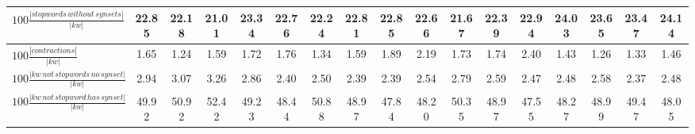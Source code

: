 \documentclass[%
 aip,
 jmp,%
 amsmath,amssymb,
 reprint,%
 floatfix,
]{revtex4-1}
\begin{document}
\begin{table}
\begin{tabular}{|l|| c|c|c|c||  c|c|c|c||   c|c|c|c||   c|c|c|c|}
$100\frac{|stopwords\,without\,synsets|}{|kw|}$ & 22.85 & 22.18 & 21.01 & 23.34 & 22.76 & 22.24 & 22.81 & 22.85 & 22.66 & 21.67 & 22.39 & 22.94 & 24.03 & 23.65 & 23.47 & 24.14 \\\hline
$100\frac{|contractions|}{|kw|}$ & 1.65 & 1.24 & 1.59 & 1.72 & 1.76 & 1.34 & 1.59 & 1.89 & 2.19 & 1.73 & 1.74 & 2.40 & 1.43 & 1.26 & 1.33 & 1.46 \\\hline
$100\frac{|kw\,not\,stopwords\,no\,synset|}{|kw|}$ & 2.94 & 3.07 & 3.26 & 2.86 & 2.40 & 2.50 & 2.39 & 2.39 & 2.54 & 2.79 & 2.59 & 2.47 & 2.48 & 2.58 & 2.37 & 2.48 \\\hline
$100\frac{|kw\,not\,stopword\,has\,synset|}{|kw|}$ & 49.92 & 50.92 & 52.42 & 49.23 & 48.44 & 50.88 & 48.97 & 47.84 & 48.20 & 50.35 & 48.97 & 47.55 & 48.27 & 48.99 & 49.47 & 48.05 \\\hline

\end{tabular}
\end{table}
\end{document}
